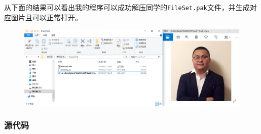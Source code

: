 \documentclass[logo,reportComp]{thesis}
\begin{document}
从下面的结果可以看出我的程序可以成功解压同学的\verb'FileSet.pak'文件，并生成对应图片且可以正常打开。
\begin{figure}[H]
\centering
\includegraphics[width=0.8\linewidth]{fig/CrossTest-3.PNG}
\end{figure}

\subsubsection{源代码}
\end{document}
